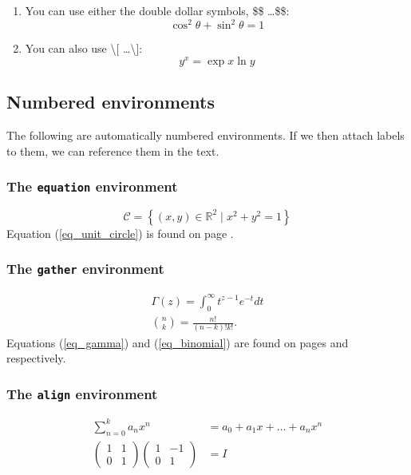\documentclass[a4paper,oneside]{book}
\begin{document}
\begin{enumerate}

\item
You can use either the double dollar symbols, \$\$ \ldots \$\$:
$$\cos^2 \theta + \sin^2 \theta = 1$$

\item
You can also use \textbackslash[ \ldots \textbackslash]:
\[
y^x = \exp{x\ln{y}}
\]

\end{enumerate}


\subsection{Numbered environments}

The following are automatically numbered environments.
If we then attach labels to them, we can reference them in the text.

\subsubsection{The \texttt{equation} environment}

\begin{equation}
\label{eq_unit_circle}
\mathcal{C}
  = \left\{ (x,y) \in \mathbb{R}^2 \mid x^2 + y^2 = 1 \right\}
\end{equation}
Equation (\ref{eq_unit_circle}) is found on page \pageref{eq_unit_circle}.


\subsubsection{The \texttt{gather} environment}

\begin{gather}
\label{eq_gamma}
\Gamma(z) = \int_0^\infty t^{z - 1} e^{-t} dt \\
\label{eq_binomial}
\binom{n}{k}
  = \frac{n!}{(n - k)!k!}.
\end{gather}
Equations (\ref{eq_gamma}) and (\ref{eq_binomial}) are found on pages \pageref{eq_gamma} and \pageref{eq_binomial} respectively.


\subsubsection{The \texttt{align} environment}

\begin{align}
   \sum_{n=0}^k a_n x^n
     &= a_0 + a_1 x + \ldots + a_n x^n\\
   \begin{pmatrix} 1 & 1 \\ 0 & 1 \end{pmatrix}
   \begin{pmatrix} 1 & -1 \\ 0 & 1 \end{pmatrix}
     &= I
\end{align}
\end{document}
